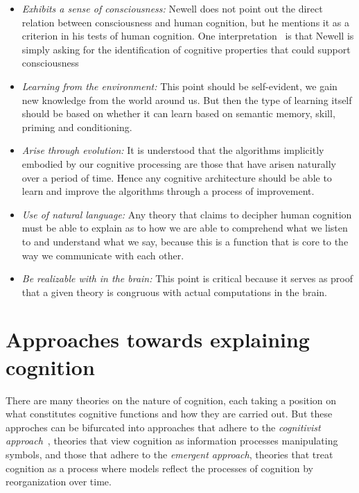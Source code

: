 \begin{itemize}
\item {\em Exhibits a sense of consciousness:} Newell does not point
  out the direct relation between consciousness and human cognition,
  but he mentions it as a criterion in his tests of human
  cognition. One interpretation~\cite{CambridgeJournals:207162} is
  that Newell is simply asking for the identification of cognitive
  properties that could support consciousness~\cite{Cohen:1996aa}

\item {\em Learning from the environment:} This point should be
  self-evident, we gain new knowledge from the world around us. But
  then the type of learning itself should be based on whether it can
  learn based on semantic memory, skill, priming and conditioning.

\item {\em Arise through evolution:} It is understood that the
  algorithms implicitly embodied by our cognitive processing are those
  that have arisen naturally over a period of time.  Hence any
  cognitive architecture should be able to learn and improve the
  algorithms through a process of improvement.

\item {\em Use of natural language:} Any theory that claims to
  decipher human cognition must be able to explain as to how we are
  able to comprehend what we listen to and understand what we say,
  because this is a function that is core to the way we communicate
  with each other.

\item {\em Be realizable with in the brain:} This point is critical
  because it serves as proof that a given theory is congruous with
  actual computations in the brain.

\end{itemize}

\section{Approaches towards explaining cognition}
There are many theories on the nature of cognition, each taking a
position on what constitutes cognitive functions and how they are
carried out. But these approches can be bifurcated into approaches
that adhere to the \emph{cognitivist
  approach}~\cite{DBLP:journals/tec/VernonMS07}, theories that view
cognition as information processes manipulating symbols, and those
that adhere to the \emph{emergent approach}, theories that treat
cognition as a process where models reflect the processes of cognition
by reorganization over time.

